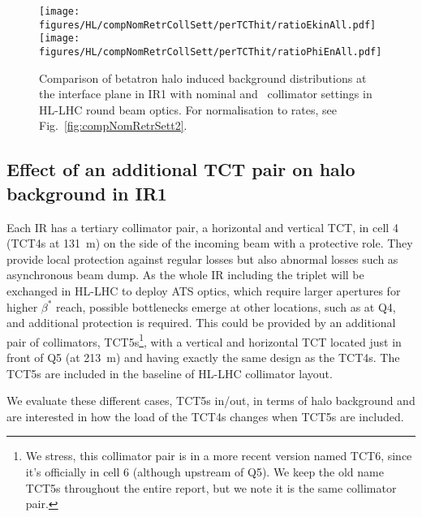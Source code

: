 \begin{figure}
\begin{center}
\texttt{[image: figures/HL/compNomRetrCollSett/perTCThit/ratioEkinAll.pdf]}
\texttt{[image: figures/HL/compNomRetrCollSett/perTCThit/ratioPhiEnAll.pdf]}
\end{center}
\vspace{-0.6cm}
 \caption{Comparison of betatron halo induced background distributions at the interface plane in IR1 with nominal and \twosigmaret~collimator settings in HL-LHC round beam optics. For normalisation to rates, see Fig.~\ref{fig:compNomRetrSett2}.
  \label{fig:compNomRetrSett}}
\end{figure}



\subsection{Effect of an additional TCT pair on halo background in IR1}

Each IR has a tertiary collimator pair, a horizontal and vertical TCT, in cell 4 (TCT4s at 131~m) on the side of the incoming beam with a protective role. They provide local protection against regular losses but also abnormal losses such as asynchronous beam dump. As the whole IR including the triplet will be exchanged in HL-LHC to deploy ATS optics, which require larger apertures for higher $\beta^*$ reach, possible bottlenecks emerge at other locations, such as at Q4, and additional protection is required. This could be provided by an additional pair of collimators, TCT5s\footnote{We stress, this collimator pair is in a more recent version named TCT6, since it's officially in cell 6 (although upstream of Q5). We keep the old name TCT5s throughout the entire report, but we note it is the same collimator pair.}, with a vertical and horizontal TCT located just in front of Q5 (at 213~m) and having exactly the same design as the TCT4s. The TCT5s are included in the baseline of HL-LHC collimator layout.

We evaluate these different cases, TCT5s in/out, in terms of halo background and are interested in how the load of the TCT4s changes when TCT5s are included.  

